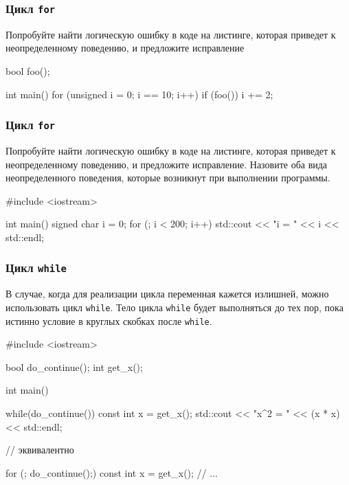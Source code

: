 \documentclass[compress, 8pt]{beamer}
\begin{document}
\begin{frame}[fragile]

    \frametitle{Цикл \texttt{for}}

    \begin{task}
        Попробуйте найти логическую ошибку в коде на листинге,
        которая приведет к неопределенному поведению, и предложите
        исправление
    \end{task}

    \begin{myinplacelisting}[minted language=cpp]
bool foo();

int main() {
    for (unsigned i = 0; i == 10; i++) {
        if (foo()) {
            i += 2;
        }
    }
}
    \end{myinplacelisting}

\end{frame}

\begin{frame}[fragile]

    \frametitle{Цикл \texttt{for}}

    \begin{task}
        Попробуйте найти логическую ошибку в коде на листинге,
        которая приведет к неопределенному поведению, и предложите
        исправление.
        Назовите оба вида неопределенного поведения, которые возникнут
        при выполнении программы.
    \end{task}

    \begin{myinplacelisting}[minted language=cpp]
#include <iostream>

int main() {
    signed char i = 0;
    for (; i < 200; i++) {
        std::cout << "i = " << i << std::endl;
    }
}
    \end{myinplacelisting}

\end{frame}

\begin{frame}[fragile]

    \frametitle{Цикл \texttt{while}}

    \hfill \break

    В случае, когда для реализации цикла переменная кажется излишней, можно
    использовать цикл \verb|while|.
    Тело цикла \verb|while| будет выполняться до тех пор, пока истинно
    условие в круглых скобках после \verb|while|.

    \begin{myinplacelisting}[minted language=cpp]
#include <iostream>

bool do_continue();
int get_x();

int main() {
    while(do_continue()) {
        const int x = get_x();
        std::cout << "x^2 = " << (x * x) << std::endl;
    }

    // эквивалентно

    for (; do_continue();) {
        const int x = get_x();
        // ...
    }
}
    \end{myinplacelisting}

\end{frame}
\end{document}
